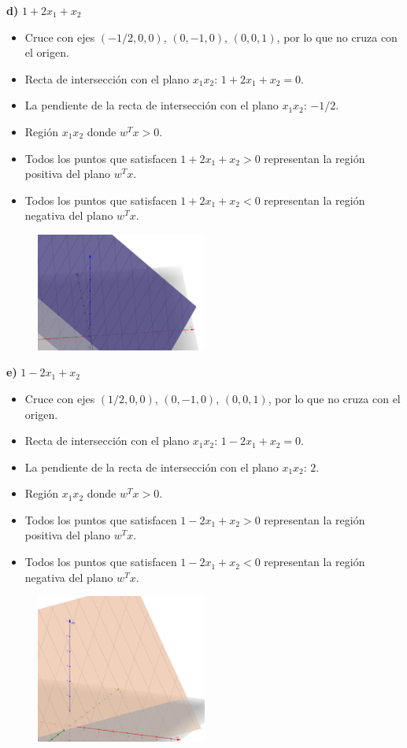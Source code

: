 \documentclass{article}
\begin{document}
\textbf{d) } $1 + 2x_1 + x_2$  
\begin{itemize}
    \item Cruce con ejes $(-1/2, 0, 0)$, $(0, -1, 0)$, $(0, 0, 1)$, por lo que no cruza con el origen.
    \item Recta de intersección con el plano $x_1x_2$: $1 + 2x_1 + x_2 = 0$.
    \item La pendiente de la recta de intersección con el plano $x_1x_2$: $-1/2$.
    \item Región $x_1x_2$ donde $w^T x > 0$.
    \item Todos los puntos que satisfacen $1 + 2x_1 + x_2 > 0$ representan la región positiva del plano $w^T x$.
    \item Todos los puntos que satisfacen $1 + 2x_1 + x_2 < 0$ representan la región negativa del plano $w^T x$.
\end{itemize}
\begin{figure}[H]
    \centering
    \includegraphics[width=0.5\textwidth]{Imagen4.png}  %
\end{figure}
\textbf{e) } $1 - 2x_1 + x_2$  
\begin{itemize}
    \item Cruce con ejes $(1/2, 0, 0)$, $(0, -1, 0)$, $(0, 0, 1)$, por lo que no cruza con el origen.
    \item Recta de intersección con el plano $x_1x_2$: $1 - 2x_1 + x_2 = 0$.
    \item La pendiente de la recta de intersección con el plano $x_1x_2$: $2$.
    \item Región $x_1x_2$ donde $w^T x > 0$.
    \item Todos los puntos que satisfacen $1 - 2x_1 + x_2 > 0$ representan la región positiva del plano $w^T x$.
    \item Todos los puntos que satisfacen $1 - 2x_1 + x_2 < 0$ representan la región negativa del plano $w^T x$.
\end{itemize}
\begin{figure}[H]
    \centering
    \includegraphics[width=0.5\textwidth]{Imagen5.png}  %
\end{figure}
\end{document}
